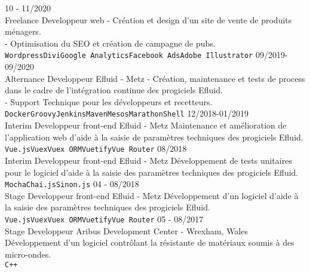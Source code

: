 \documentclass[9pt]{developercv} %
\begin{document}
\begin{entrylist}
	\entry
		{10 - 11/2020\\\footnotesize{Freelance}}
		{Developpeur web}
		{}
		{- Création et design d'un site de vente de produits ménagers.\\
- Optimisation du SEO et création de campagne de pubs. \\ \texttt{Wordpress}\slashsep\texttt{Divi}\slashsep\texttt{Google Analytics}\slashsep\texttt{Facebook Ads}\slashsep\texttt{Adobe Illustrator}}
	\entry
		{09/2019-09/2020\\\footnotesize{Alternance}}
		{Developpeur}
		{Efluid - Metz}
		{- Création, maintenance et tests de process dans le cadre de l'intégration continue des progiciels Efluid.\\
- Support Technique pour les développeurs et recetteurs.\\ \texttt{Docker}\slashsep\texttt{Groovy}\slashsep\texttt{Jenkins}\slashsep\texttt{Maven}\slashsep\texttt{Mesos}\slashsep\texttt{Marathon}\slashsep\texttt{Shell}}
	\entry
		{12/2018-01/2019\\\footnotesize{Interim}}
		{Developpeur front-end}
		{Efluid - Metz}
		{Maintenance et amélioration de l'application web d'aide à la saisie de paramètres techniques des progiciels Efluid. \\ \texttt{Vue.js}\slashsep\texttt{Vuex}\slashsep\texttt{Vuex ORM}\slashsep\texttt{Vuetify}\slashsep\texttt{Vue Router}}
	\entry
		{08/2018\\\footnotesize{Interim}}
		{Developpeur front-end}
		{Efluid - Metz}
		{Développement de tests unitaires pour le logiciel d'aide à la saisie des paramètres techniques des progiciels Efluid. \\ \texttt{Mocha}\slashsep\texttt{Chai.js}\slashsep\texttt{Sinon.js}}
	\entry
		{04 - 08/2018\\\footnotesize{Stage}}
		{Developpeur front-end}
		{Efluid - Metz}
		{Développement d'un logiciel d'aide à la saisie des paramètres techniques des progiciels Efluid.\\ \texttt{Vue.js}\slashsep\texttt{Vuex}\slashsep\texttt{Vuex ORM}\slashsep\texttt{Vuetify}\slashsep\texttt{Vue Router}}
	\entry
		{05 - 08/2017\\\footnotesize{Stage}}
		{Developpeur}
		{Aribus Development Center - Wrexham, Wales}
		{Développement d'un logiciel contrôlant la résistante de matériaux soumis à des micro-ondes.\\ \texttt{C++}}
\end{entrylist}
\end{document}
